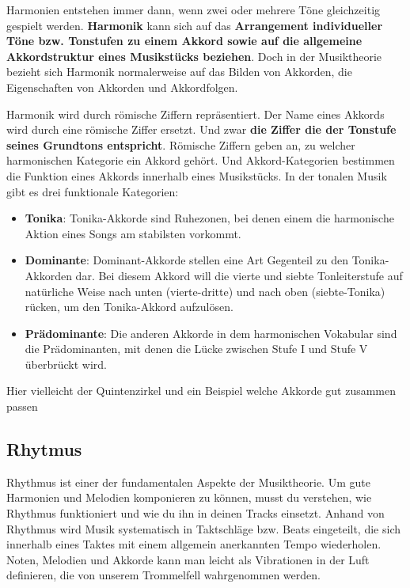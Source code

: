 Harmonien entstehen immer dann, wenn zwei oder mehrere Töne gleichzeitig gespielt werden. \textbf{Harmonik} kann 
sich auf das \textbf{Arrangement individueller Töne bzw. Tonstufen zu einem Akkord sowie auf die allgemeine Akkordstruktur 
eines Musikstücks beziehen}. Doch in der Musiktheorie bezieht sich Harmonik normalerweise auf das Bilden 
von Akkorden, die Eigenschaften von Akkorden und Akkordfolgen.

Harmonik wird durch römische Ziffern repräsentiert. Der Name eines Akkords wird durch eine römische Ziffer
ersetzt. Und zwar \textbf{die Ziffer die der Tonstufe seines Grundtons entspricht}. Römische Ziffern geben an, 
zu welcher harmonischen Kategorie ein Akkord gehört. Und Akkord-Kategorien bestimmen die Funktion eines 
Akkords innerhalb eines Musikstücks. In der tonalen Musik gibt es drei funktionale Kategorien:

\begin{itemize}
    \item \textbf{Tonika}: Tonika-Akkorde sind Ruhezonen, bei denen einem die harmonische Aktion eines 
    Songs am stabilsten vorkommt.
    \item \textbf{Dominante}: Dominant-Akkorde stellen eine Art Gegenteil zu den Tonika-Akkorden dar. 
    Bei diesem Akkord will die vierte und siebte Tonleiterstufe auf natürliche Weise nach unten 
    (vierte-dritte) und nach oben (siebte-Tonika) rücken, um den Tonika-Akkord aufzulösen.
    \item \textbf{Prädominante}: Die anderen Akkorde in dem harmonischen Vokabular sind die Prädominanten, 
    mit denen die Lücke zwischen Stufe I und Stufe V überbrückt wird.
\end{itemize}

Hier vielleicht der Quintenzirkel und ein Beispiel welche Akkorde gut zusammen passen

\subsection{Rhytmus}
Rhythmus ist einer der fundamentalen Aspekte der Musiktheorie. Um gute Harmonien und Melodien komponieren zu können, musst du verstehen, wie Rhythmus funktioniert und wie du ihn in deinen Tracks einsetzt. Anhand von Rhythmus wird Musik systematisch in Taktschläge bzw. Beats eingeteilt, die sich innerhalb eines Taktes mit einem allgemein anerkannten Tempo wiederholen. Noten, Melodien und Akkorde kann man leicht als Vibrationen in der Luft definieren, die von unserem Trommelfell wahrgenommen werden.

